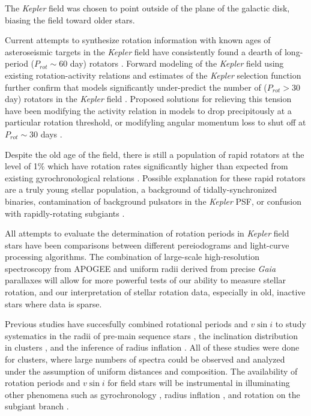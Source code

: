 \documentclass[manuscript]{aastex6}
\newcommand{\vsini}{\ensuremath{v \sin i}}
\newcommand{\Kepler}{\mbox{\textit{Kepler}}}
\newcommand{\Gaia}{\mbox{\textit{Gaia}}}
\begin{document}
The \Kepler{} field was chosen to point outside of the plane of the galactic
disk, biasing the field toward older stars. 

Current attempts to synthesize rotation information with known ages of
asteroseismic targets in the \Kepler{} field have consistently found a dearth
of long-period (\(P_{rot} \sim 60\) day) rotators \citet{Angus15,vanSaders16}. 
Forward modeling of the \Kepler{} field using existing rotation-activity
relations and estimates of the \Kepler{} selection function further confirm 
that models significantly under-predict the number of (\(P_{rot} > 30\) day) 
rotators in the \Kepler{} field \citep{vanSaders18}. Proposed solutions for 
relieving this tension have been modifying the activity relation in models to 
drop precipitously at a particular rotation threshold, or modifyling angular 
momentum loss to shut off at \(P_{rot} \sim 30\) days \citep{vanSaders18}.

Despite the old age of the
field, there is still a population of rapid rotators at the level of 1\% 
which have rotation rates significantly higher than expected from
existing gyrochronological relations \citep{McQuillan14}. Possible explanation
for these rapid rotators are a truly young stellar population, a background of
tidally-synchronized binaries, contamination of background pulsators in the
\Kepler{} PSF, or confusion with rapidly-rotating subgiants \citep{vanSaders13}. 

All attempts to evaluate the determination of rotation periods in
\Kepler{} field stars have been comparisons between different pereiodograms and
light-curve processing algorithms. The combination of large-scale
high-resolution spectroscopy from APOGEE and uniform radii derived from precise
\Gaia{} parallaxes \citep{Stevens17} will allow for more powerful tests of our
ability to measure stellar rotation, and our interpretation of stellar rotation
data, especially in old, inactive stars where data is sparse.

Previous studies have succesfully combined rotational periods and \vsini{} 
to study systematics in the radii of pre-main sequence stars
\citep{Rhode01,Jeffries07}, the inclination distribution in clusters 
\citep{Jackson10}, and the inference of radius inflation
\citep{Jackson09,Jackson16,Jackson18}. All of these studies were done for
clusters, where large numbers of spectra could be observed and analyzed under 
the assumption of uniform distances and composition. The availability of
rotation periods and \vsini{} for field stars will be instrumental in 
illuminating other phenomena such as gyrochronology 
\citep{Barnes07,Mamajek08,Angus15}, radius inflation \citep{Jackson18}, and 
rotation on the subgiant branch \citep{vanSaders13}.
\end{document}
